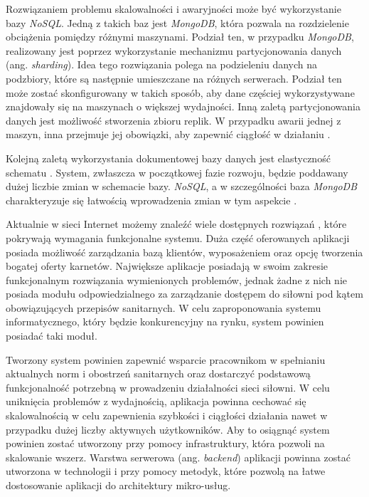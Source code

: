 \documentclass[a4paper,twoside,12pt]{book}
\newcommand{\obcy}[1]{\emph{#1}}
\newcommand{\ang}[1]{{\selectlanguage{british}\obcy{#1}}}
\begin{document}
Rozwiązaniem problemu skalowalności i awaryjności może być wykorzystanie bazy \textit{NoSQL}. Jedną z takich baz jest \textit{MongoDB}, która pozwala na rozdzielenie obciążenia pomiędzy różnymi maszynami. Podział ten, w przypadku \textit{MongoDB}, realizowany jest poprzez wykorzystanie mechanizmu partycjonowania danych (ang. \ang{sharding}). Idea tego rozwiązania polega na podzieleniu danych na podzbiory, które są następnie umieszczane na różnych serwerach. Podział ten może zostać skonfigurowany w takich sposób, aby dane częściej wykorzystywane znajdowały się na maszynach o większej wydajności. Inną zaletą partycjonowania danych jest możliwość stworzenia zbioru replik. W przypadku awarii jednej z maszyn, inna przejmuje jej obowiązki, aby zapewnić ciągłość w działaniu \cite{bib:mongodb_guide}.

Kolejną zaletą wykorzystania dokumentowej bazy danych jest elastyczność schematu \cite{bib:noSqlVsSql}. System, zwłaszcza w początkowej fazie rozwoju, będzie poddawany dużej liczbie zmian w schemacie bazy. \textit{NoSQL}, a w szczególności baza \textit{MongoDB} charakteryzuje się łatwością wprowadzenia zmian w tym aspekcie \cite{bib:mongoPros}.

Aktualnie w sieci Internet możemy znaleźć wiele dostępnych rozwiązań \cite{bib:perfectgym} \cite{bib:wodguru}, które pokrywają wymagania funkcjonalne systemu. Duża część oferowanych aplikacji posiada możliwość zarządzania bazą klientów, wyposażeniem oraz opcję tworzenia bogatej oferty karnetów. Największe aplikacje posiadają w swoim zakresie funkcjonalnym rozwiązania wymienionych problemów, jednak żadne z nich nie posiada modułu odpowiedzialnego za zarządzanie dostępem do siłowni pod kątem obowiązujących przepisów sanitarnych. W celu zaproponowania systemu informatycznego, który będzie konkurencyjny na rynku, system powinien posiadać taki moduł.

Tworzony system powinien zapewnić wsparcie pracownikom w spełnianiu aktualnych norm i obostrzeń sanitarnych oraz dostarczyć podstawową funkcjonalność potrzebną w prowadzeniu działalności sieci siłowni. W celu uniknięcia problemów z wydajnością, aplikacja powinna cechować się skalowalnością w celu zapewnienia szybkości i ciągłości działania nawet w przypadku dużej liczby aktywnych użytkowników. Aby to osiągnąć system powinien zostać utworzony przy pomocy infrastruktury, która pozwoli na skalowanie wszerz. Warstwa serwerowa (ang. \ang{backend}) aplikacji powinna zostać utworzona w technologii i przy pomocy metodyk, które pozwolą na łatwe dostosowanie aplikacji do architektury mikro-usług.
\end{document}
